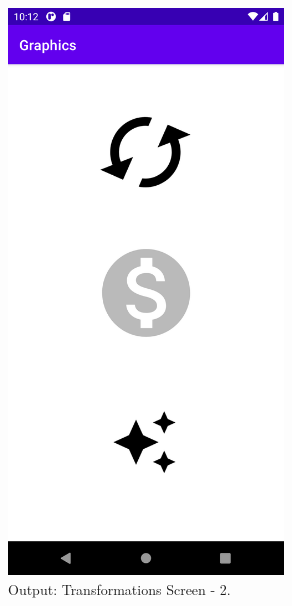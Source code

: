 \documentclass[12pt, a4]{article}
\begin{document}
\subsection*{}
\begin{figure}[h]
\centering
\caption{Output: Transformations Screen - 2.}
\includegraphics[height=15cm, width=7.3cm]{Graphics/Screenshots/Graphics-6.png}
\end{figure}


\newpage
\end{document}
